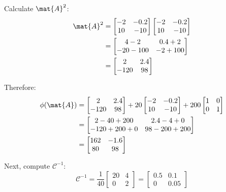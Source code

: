Calculate $\mat{A}^2$:
\begin{align}
\mat{A}^2 &= \begin{bmatrix} -2 & -0.2 \\ 10 & -10 \end{bmatrix}
\begin{bmatrix} -2 & -0.2 \\ 10 & -10 \end{bmatrix} \nonumber \\
&= \begin{bmatrix} 4-2 & 0.4+2 \\ -20-100 & -2+100 \end{bmatrix} \nonumber \\
&= \begin{bmatrix} 2 & 2.4 \\ -120 & 98 \end{bmatrix}
\end{align}

Therefore:
\begin{align}
\phi(\mat{A}) &= \begin{bmatrix} 2 & 2.4 \\ -120 & 98 \end{bmatrix} +
20\begin{bmatrix} -2 & -0.2 \\ 10 & -10 \end{bmatrix} +
200\begin{bmatrix} 1 & 0 \\ 0 & 1 \end{bmatrix} \nonumber \\
&= \begin{bmatrix} 2-40+200 & 2.4-4+0 \\ -120+200+0 & 98-200+200 \end{bmatrix} \nonumber \\
&= \begin{bmatrix} 162 & -1.6 \\ 80 & 98 \end{bmatrix}
\end{align}

Next, compute $\mathcal{C}^{-1}$:
\begin{equation}
\mathcal{C}^{-1} = \frac{1}{40}\begin{bmatrix} 20 & 4 \\ 0 & 2 \end{bmatrix}
= \begin{bmatrix} 0.5 & 0.1 \\ 0 & 0.05 \end{bmatrix}
\end{equation}

